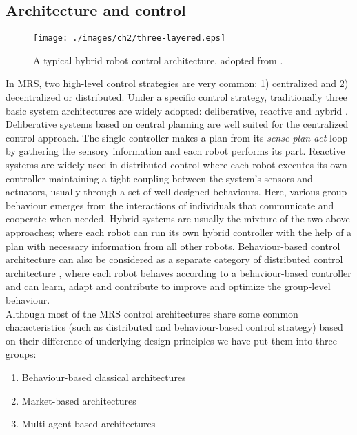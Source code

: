 \subsection*{Architecture and control}
\label{bg:mrs:arch}
\begin{figure}
\begin{center}
\texttt{[image: ./images/ch2/three-layered.eps]} %
\caption{A typical hybrid robot control architecture, adopted from \protect{}.} 
\label{fig:three-layer-arch}
\end{center}
\end{figure}
In MRS, two high-level control strategies are very common: 1) centralized and 2) decentralized or distributed. Under a specific control strategy, traditionally three basic system architectures are widely adopted: deliberative, reactive and hybrid \cite{Mataric2007,Arkin1998}. Deliberative systems based on central planning are well suited for the centralized control approach. The single controller makes a plan from its {\em sense-plan-act} loop by gathering the sensory information and each robot performs its part. Reactive systems are widely used in distributed control where each robot executes its own controller maintaining a tight coupling between the system's sensors and actuators, usually through a set of well-designed behaviours. Here, various group behaviour emerges from the interactions of individuals that communicate and cooperate when needed. Hybrid systems are usually the mixture of the two above approaches; where each robot can run its own hybrid controller with the help of a plan with necessary information from all other robots. Behaviour-based control architecture can also be considered as a separate category of distributed control architecture \cite{Mataric2007}, where each robot behaves according to a behaviour-based controller and can learn, adapt and contribute to improve and optimize the group-level behaviour.\\ 
Although most of the MRS control architectures share some common characteristics (such as distributed and behaviour-based control strategy) based on their difference of underlying design principles we have put them into three groups:
\begin{enumerate}
\item Behaviour-based classical architectures
\item Market-based architectures
\item Multi-agent based architectures
\end{enumerate}
